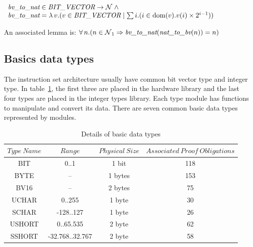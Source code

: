 \documentclass[a4paper]{llncs}
\begin{document}
$
\begin{array}{l}
\textit{bv\_to\_nat} \in \textit{BIT\_VECTOR} \fun \nat  \land \\
\textit{bv\_to\_nat} = \lambda v .  (v \in \textit{BIT\_VECTOR} \mid  \sum i . (i \in \dom(v) . v(i)
\times 2^{i-1}))
\end{array}
$

An  associated lemma is: $\forall n . (n \in \nat_1 \implies \textit{bv\_to\_nat}(\textit{nat\_to\_bv}(n)) = n)$



\subsection{Basics data types}

The instruction set architecture usually have common bit vector type and integer type.
In table~\ref{tab:types}, the first three are placed in the hardware library and the last four types are placed in the integer types library. 
Each type module has functions to manipulate and convert its data. There are seven common basic data types represented by modules.


\begin{table}
\caption{Details of basic data types}
\label{tab:types}
\begin{center}
\begin{tabular}{|c|c|c|c|}
\hline
 $Type\ Name$ & $Range$ & $Physical\ Size $  & $Associated\ Proof\ Obligations$ \\\hline
 BIT & 0..1 & 1 bit &   118 \\\hline %
 BYTE & -- & 1 bytes &  153\\\hline%
 BV16 & -- & 2 bytes &  75 \\ \hline%
 UCHAR & 0..255 & 1 byte &  30 \\\hline %
 SCHAR & -128..127 & 1 byte & 26 \\\hline %
 USHORT & 0..65.535 & 2 byte & 62 \\\hline %
 SSHORT & -32.768..32.767 & 2 byte & 58\\\hline %
\end{tabular}
\end{center}
\end{table}
\end{document}

